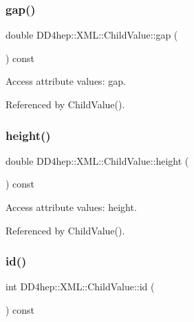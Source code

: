 \subsubsection{\texorpdfstring{gap()}{gap()}}
{\footnotesize\ttfamily double D\+D4hep\+::\+X\+M\+L\+::\+Child\+Value\+::gap (\begin{DoxyParamCaption}{ }\end{DoxyParamCaption}) const}



Access attribute values\+: gap. 



Referenced by Child\+Value().

\hypertarget{struct_d_d4hep_1_1_x_m_l_1_1_child_value_ac54e21cc5e8c93f02bea44cc97b91c24}{}\label{struct_d_d4hep_1_1_x_m_l_1_1_child_value_ac54e21cc5e8c93f02bea44cc97b91c24} 
\subsubsection{\texorpdfstring{height()}{height()}}
{\footnotesize\ttfamily double D\+D4hep\+::\+X\+M\+L\+::\+Child\+Value\+::height (\begin{DoxyParamCaption}{ }\end{DoxyParamCaption}) const}



Access attribute values\+: height. 



Referenced by Child\+Value().

\hypertarget{struct_d_d4hep_1_1_x_m_l_1_1_child_value_a6a191b1198bc401dd8ce753d705edd88}{}\label{struct_d_d4hep_1_1_x_m_l_1_1_child_value_a6a191b1198bc401dd8ce753d705edd88} 
\subsubsection{\texorpdfstring{id()}{id()}\hspace{0.1cm}{\footnotesize\ttfamily [1/2]}}
{\footnotesize\ttfamily int D\+D4hep\+::\+X\+M\+L\+::\+Child\+Value\+::id (\begin{DoxyParamCaption}{ }\end{DoxyParamCaption}) const}



